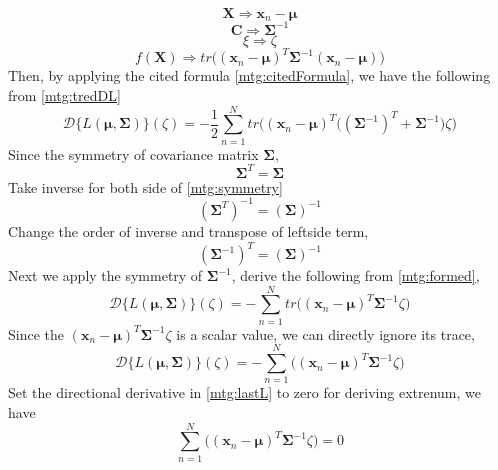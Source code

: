 \documentclass[11pt,a4paper]{article}
\newcommand{\htab}{\hspace*{0.63cm}}
\newcommand{\dd}[2]{\mathcal{D}\{ #1 \} (#2)}
\newcommand{\bs}[1]{\boldsymbol{#1}}
\newcommand{\bmu}{\boldsymbol{\mu}}
\newcommand{\bsum}{\boldsymbol{\Sigma}}
\newcommand{\xnv}{\boldsymbol{x}_{n} }
\begin{document}
    \begin{equation} \bs{X} \Rightarrow \xnv-\bmu \end{equation}
    \begin{equation} \bs{C} \Rightarrow \bsum^{-1} \end{equation}
    \begin{equation} \xi \Rightarrow \zeta \end{equation}
    \begin{equation} f(\bs{X}) \Rightarrow tr\Big( (\xnv-\bmu)^{T} \bsum^{-1} (\xnv-\bmu) \Big) \end{equation}
\htab Then, by applying the cited formula \eqref{mtg:citedFormula}, 
        we have the following from \eqref{mtg:tredDL}
    \begin{equation}
        \dd{L(\bmu,\bsum)}{\zeta} \label{mtg:formed}
        = -\frac{1}{2} \sum_{n=1}^{N}{tr\Big( (\xnv-\bmu)^{T} 
            \big( (\bsum^{-1})^{T} + \bsum^{-1} \big) \zeta \Big)}   
    \end{equation}
\htab Since the symmetry of covariance matrix $\bsum$, 
    \begin{equation} \label{mtg:symmetry}
        \bsum^{T} = \bsum
    \end{equation}
\htab Take inverse for both side of \eqref{mtg:symmetry}
    \begin{equation}  (\bsum^{T})^{-1} = (\bsum)^{-1}  \end{equation}
\htab Change the order of inverse and transpose of leftside term,
    \begin{equation}  \label{mtg:invSymmetry} (\bsum^{-1})^{T} = (\bsum)^{-1}  \end{equation}
\htab Next we apply the symmetry of $\bsum^{-1}$, derive the following from \eqref{mtg:formed},
    \begin{equation}
        \dd{L(\bmu,\bsum)}{\zeta} 
        = -\sum_{n=1}^{N}{tr\Big( (\xnv-\bmu)^{T} \bsum^{-1} \zeta \Big)}   
    \end{equation}
\htab Since the $(\xnv-\bmu)^{T} \bsum^{-1} \zeta$ is a scalar value, we can directly ignore its trace, 
    \begin{equation} \label{mtg:lastL}
        \dd{L(\bmu,\bsum)}{\zeta} 
        = -\sum_{n=1}^{N}{ \Big( (\xnv-\bmu)^{T} \bsum^{-1}  \zeta \Big)}   
    \end{equation}
\htab Set the directional derivative in \eqref{mtg:lastL} to zero for deriving extrenum, we have
    \begin{equation} 
        \sum_{n=1}^{N}{ \Big( (\xnv-\bmu)^{T} \bsum^{-1}  \zeta \Big)} = 0
    \end{equation}
\end{document}
